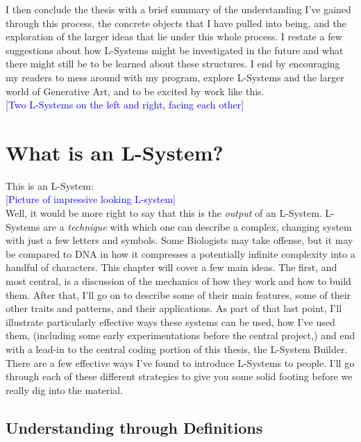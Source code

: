 \documentclass[12pt,twoside]{reedthesis}
\begin{document}
	I then conclude the thesis with a brief summary of the understanding I've gained through this process, the concrete objects that I have pulled into being, and the exploration of the larger ideas that lie under this whole process. I restate a few suggestions about how L-Systems might be investigated in the future and what there might still be to be learned about these structures. I end by encouraging my readers to mess around with my program, explore L-Systems and the larger world of Generative Art, and to be excited by work like this.\\
	
	\textcolor{blue}{[Two L-Systems on the left and right, facing each other]}\\
	
\chapter{What is an L-System?}

This is an L-System:\\

\textcolor{blue}{[Picture of impressive looking L-system]}\\

	Well, it would be more right to say that this is the \textit{output} of an L-System. L-Systems are a \textit{technique} with which one can describe a complex, changing system with just a few letters and symbols. Some Biologists may take offense, but it may be compared to DNA in how it compresses a potentially infinite complexity into a handful of characters. This chapter will cover a few main ideas. The first, and most central, is a discussion of the mechanics of how they work and how to build them. After that, I’ll go on to describe some of their main features, some of their other traits and patterns, and their applications. As part of that last point, I’ll illustrate particularly effective ways these systems can be used, how I’ve used them, (including some early experimentations before the central project,) and end with a lead-in to the central coding portion of this thesis, the L-System Builder.\\

	There are a few effective ways I've found to introduce L-Systems to people. I'll go through each of these different strategies to give you some solid footing before we really dig into the material.\\


\section{Understanding through Definitions}
\end{document}

